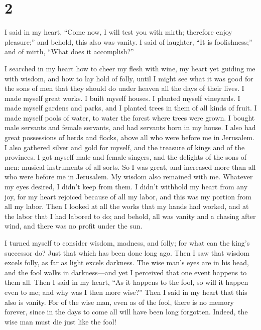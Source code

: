 \hypertarget{section-1}{%
\section{2}\label{section-1}}

 I said in my heart, ``Come now, I will test you with mirth;
therefore enjoy pleasure;'' and behold, this also was vanity.
 I said of laughter, ``It is foolishness;'' and of mirth,
``What does it accomplish?''

 I searched in my heart how to cheer my flesh with wine, my
heart yet guiding me with wisdom, and how to lay hold of folly, until I
might see what it was good for the sons of men that they should do under
heaven all the days of their lives.  I made myself great
works. I built myself houses. I planted myself vineyards.  I
made myself gardens and parks, and I planted trees in them of all kinds
of fruit.  I made myself pools of water, to water the forest
where trees were grown.  I bought male servants and female
servants, and had servants born in my house. I also had great
possessions of herds and flocks, above all who were before me in
Jerusalem.  I also gathered silver and gold for myself, and
the treasure of kings and of the provinces. I got myself male and female
singers, and the delights of the sons of men: musical instruments of all
sorts.  So I was great, and increased more than all who were
before me in Jerusalem. My wisdom also remained with me. 
Whatever my eyes desired, I didn't keep from them. I didn't withhold my
heart from any joy, for my heart rejoiced because of all my labor, and
this was my portion from all my labor.  Then I looked at
all the works that my hands had worked, and at the labor that I had
labored to do; and behold, all was vanity and a chasing after wind, and
there was no profit under the sun.

 I turned myself to consider wisdom, madness, and folly;
for what can the king's successor do? Just that which has been done long
ago.  Then I saw that wisdom excels folly, as far as light
excels darkness.  The wise man's eyes are in his head, and
the fool walks in darkness---and yet I perceived that one event happens
to them all.  Then I said in my heart, ``As it happens to
the fool, so will it happen even to me; and why was I then more wise?''
Then I said in my heart that this also is vanity.  For of
the wise man, even as of the fool, there is no memory forever, since in
the days to come all will have been long forgotten. Indeed, the wise man
must die just like the fool!

